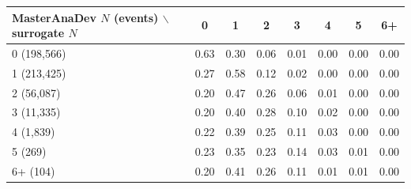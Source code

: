\begin{tabular}{lccccccc}
\toprule
MasterAnaDev $N$ (events) $\backslash$ surrogate $N$ & 0 & 1 & 2 & 3 & 4 & 5 & 6+ \\
\midrule
0 (198,566) & 0.63 & 0.30 & 0.06 & 0.01 & 0.00 & 0.00 & 0.00 \\
1 (213,425) & 0.27 & 0.58 & 0.12 & 0.02 & 0.00 & 0.00 & 0.00 \\
2 (56,087) & 0.20 & 0.47 & 0.26 & 0.06 & 0.01 & 0.00 & 0.00 \\
3 (11,335) & 0.20 & 0.40 & 0.28 & 0.10 & 0.02 & 0.00 & 0.00 \\
4 (1,839) & 0.22 & 0.39 & 0.25 & 0.11 & 0.03 & 0.00 & 0.00 \\
5 (269) & 0.23 & 0.35 & 0.23 & 0.14 & 0.03 & 0.01 & 0.00 \\
6+ (104) & 0.20 & 0.41 & 0.26 & 0.11 & 0.01 & 0.01 & 0.00 \\
\bottomrule
\end{tabular}
